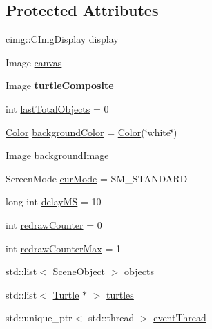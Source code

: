 \subsection*{Protected Attributes}
\begin{DoxyCompactItemize}
\item 
cimg\+::\+C\+Img\+Display \hyperlink{classcturtle_1_1InteractiveTurtleScreen_a5ab4e006c97cfd1610dc565188e9c9b0}{display}
\item 
Image \hyperlink{classcturtle_1_1InteractiveTurtleScreen_a5231bfae24c5e5387059fccffa9a7170}{canvas}
\item 
\mbox{\label{classcturtle_1_1InteractiveTurtleScreen_a3a6e3d9249b40dccc5a4e4f0f1dd4075}} 
Image {\bfseries turtle\+Composite}
\item 
int \hyperlink{classcturtle_1_1InteractiveTurtleScreen_afd74d43945f4eb82bb71e0d2b4a72a50}{last\+Total\+Objects} = 0
\item 
\hyperlink{classcturtle_1_1Color}{Color} \hyperlink{classcturtle_1_1InteractiveTurtleScreen_a3cc73fa2f1e0f2579a5bc1917396e023}{background\+Color} = \hyperlink{classcturtle_1_1Color}{Color}(\char`\"{}white\char`\"{})
\item 
Image \hyperlink{classcturtle_1_1InteractiveTurtleScreen_a139236df336d32f5cb44ab8ccfb16475}{background\+Image}
\item 
Screen\+Mode \hyperlink{classcturtle_1_1InteractiveTurtleScreen_a6fd7fc060f0e4adcc08ab1e43e758c49}{cur\+Mode} = S\+M\+\_\+\+S\+T\+A\+N\+D\+A\+RD
\item 
long int \hyperlink{classcturtle_1_1InteractiveTurtleScreen_a26338beec078bb1c29792cd658c1be71}{delay\+MS} = 10
\item 
int \hyperlink{classcturtle_1_1InteractiveTurtleScreen_a39c21ce1ed1de241676ae329ecd962b8}{redraw\+Counter} = 0
\item 
int \hyperlink{classcturtle_1_1InteractiveTurtleScreen_a7cf0a4e382da4be238be3f9d3510b4e7}{redraw\+Counter\+Max} = 1
\item 
std\+::list$<$ \hyperlink{structcturtle_1_1SceneObject}{Scene\+Object} $>$ \hyperlink{classcturtle_1_1InteractiveTurtleScreen_abaea1170c38b5e79865841834c50718d}{objects}
\item 
std\+::list$<$ \hyperlink{classcturtle_1_1Turtle}{Turtle} $\ast$ $>$ \hyperlink{classcturtle_1_1InteractiveTurtleScreen_ae227fdb4ee9017964e314d6e0c76cee4}{turtles}
\item 
std\+::unique\+\_\+ptr$<$ std\+::thread $>$ \hyperlink{classcturtle_1_1InteractiveTurtleScreen_ace652d27f7e65ee15cd4dab7074874d2}{event\+Thread}

\end{DoxyCompactItemize}
